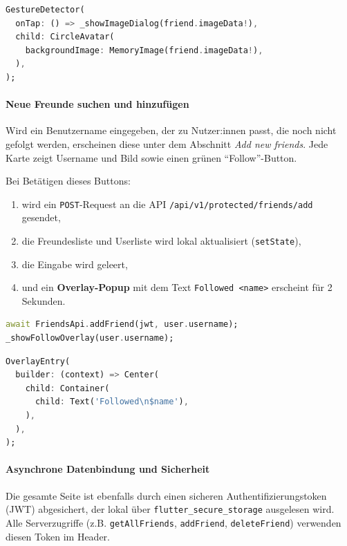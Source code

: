 \documentclass[11pt,a4paper]{article}
\begin{document}
\begin{lstlisting}[language=Dart, caption=Profilbildanzeige und Zoom-Dialog]
GestureDetector(
  onTap: () => _showImageDialog(friend.imageData!),
  child: CircleAvatar(
    backgroundImage: MemoryImage(friend.imageData!),
  ),
);
\end{lstlisting}
\paragraph{Neue Freunde suchen und hinzufügen}
Wird ein Benutzername eingegeben, der zu Nutzer:innen passt, die noch nicht gefolgt werden, erscheinen diese unter dem Abschnitt \textit{Add new friends}. Jede Karte zeigt Username und Bild sowie einen grünen ``Follow''-Button.

Bei Betätigen dieses Buttons:
\begin{enumerate}
    \item wird ein \texttt{POST}-Request an die API \texttt{/api/v1/protected/friends/add} gesendet,
    \item die Freundesliste und Userliste wird lokal aktualisiert (\texttt{setState}),
    \item die Eingabe wird geleert,
    \item und ein \textbf{Overlay-Popup} mit dem Text \texttt{Followed <name>} erscheint für 2 Sekunden.
\end{enumerate}

\begin{lstlisting}[language=Dart, caption=Freund hinzufügen und Overlay anzeigen]
await FriendsApi.addFriend(jwt, user.username);
_showFollowOverlay(user.username);
\end{lstlisting}

\begin{lstlisting}[language=Dart, caption=Overlay-Feedback nach erfolgreichem Hinzufügen]
OverlayEntry(
  builder: (context) => Center(
    child: Container(
      child: Text('Followed\n$name'),
    ),
  ),
);
\end{lstlisting}

\paragraph{Asynchrone Datenbindung und Sicherheit}
Die gesamte Seite ist ebenfalls durch einen sicheren Authentifizierungstoken (JWT) abgesichert, der lokal über \texttt{flutter\_secure\_storage} ausgelesen wird. Alle Serverzugriffe (z.B. \texttt{getAllFriends}, \texttt{addFriend}, \texttt{deleteFriend}) verwenden diesen Token im Header.
\end{document}
